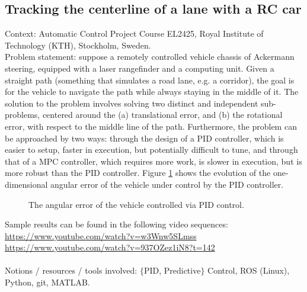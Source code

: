 \subsection{Tracking the centerline of a lane with a RC car}

Context: Automatic Control Project Course EL2425, Royal Institute of
Technology (KTH), Stockholm, Sweden.\\

Problem statement: suppose a remotely controlled vehicle chassis of Ackermann
steering, equipped with a laser rangefinder and a computing unit. Given a
straight path (something that simulates a road lane, e.g. a corridor), the goal
is for the vehicle to navigate the path while always staying in the middle of it.
The solution to the problem involves solving two distinct and independent
sub-problems, centered around the (a) translational error, and (b) the
rotational error, with respect to the middle line of the path. Furthermore, the
problem can be approached by two ways: through the design of a PID controller,
which is easier to setup, faster in execution, but potentially difficult to tune,
and through that of a MPC controller, which requires more work, is slower in
execution, but is more robust than the PID controller. Figure
\ref{fig:centerline_pid_error} shows the evolution of the one-dimensional
angular error of the vehicle under control by the PID controller.

\begin{figure}[H]\centering
  \scalebox{0.6}{}
  \caption{The angular error of the vehicle controlled via PID control.}
  \label{fig:centerline_pid_error}
\end{figure}

\noindent Sample results can be found in the following video sequences:\\
\url{https://www.youtube.com/watch?v=w3Wnw5SLmss}\\
\url{https://www.youtube.com/watch?v=937OZez1iN8?t=142}\\\\
Notions / resources / tools involved: $\{$PID, Predictive$\}$ Control, ROS (Linux), Python, git, MATLAB.

